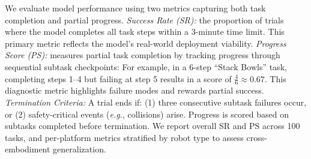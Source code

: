 We evaluate model performance using two metrics capturing both task completion and partial progress.
\textit{Success Rate (SR):} 
the proportion of trials where the model completes all task steps within a 3-minute time limit.
This primary metric reflects the model's real-world deployment viability.
\textit{Progress Score (PS):} 
measures partial task completion by tracking progress through sequential subtask checkpoints:
For example, in a 6-step ``Stack Bowls'' task, completing steps 1–4 but failing at step 5 results in a score of $\frac{4}{6} \approx 0.67$. This diagnostic metric highlights failure modes and rewards partial success.
\textit{Termination Criteria:}
A trial ends if: (1) three consecutive subtask failures occur, or (2) safety-critical events (\textit{e.g.}, collisions) arise. Progress is scored based on subtasks completed before termination.
We report overall SR and PS across 100 tasks, and per-platform metrics stratified by robot type to assess cross-embodiment generalization.
